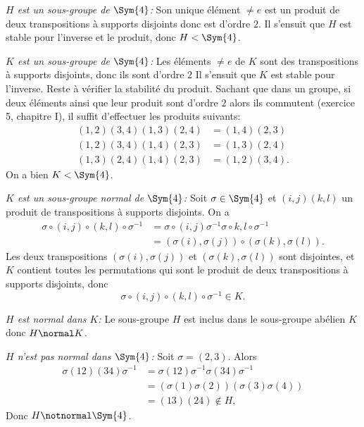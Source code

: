 \emph{$H$ est un sous-groupe de $\Sym{4}$:}
Son unique élément $\neq e$ est un produit de deux transpositions à supports
disjoints donc est d'ordre $2$. Il s'ensuit que $H$ est stable pour l'inverse et
le produit, donc $H<\Sym{4}$.

\emph{$K$ est un sous-groupe de $\Sym{4}$:}
Les éléments $\neq e$ de $K$ sont des transpositions à supports disjoints, donc
ils sont d'ordre $2$ Il s'ensuit que $K$ est stable pour l'inverse. Reste à
vérifier la stabilité du produit. Sachant que dans un groupe, si deux éléments
ainsi que leur produit sont d'ordre $2$ alors ils commutent (exercice 5,
chapitre I), il suffit
d'effectuer les produits suivants:
%
\begin{align*}
  (1,2)(3,4)(1,3)(2,4) &= (1,4)(2,3) \\
  (1,2)(3,4)(1,4)(2,3) &= (1,3)(2,4) \\
  (1,3)(2,4)(1,4)(2,3) &= (1,2)(3,4).
\end{align*}
%
On a bien $K<\Sym{4}$.

\emph{$K$ est un sous-groupe normal de $\Sym{4}$:}
Soit $\sigma\in\Sym{4}$ et $(i,j)(k,l)$ un produit de transpositions à supports
disjoints. On a
%
\begin{align*}
  \sigma\circ(i,j)\circ(k,l)\circ\sigma^{-1}
  &= \sigma\circ(i,j)\sigma^{-1}\sigma\circ{k,l}\circ\sigma^{-1} \\
  &= (\sigma(i),\sigma(j))\circ(\sigma(k),\sigma(l)).
\end{align*}
%
Les deux transpositions $(\sigma(i),\sigma(j))$ et $(\sigma(k),\sigma(l))$ sont
disjointes, et $K$ contient toutes les permutations qui sont le produit de deux
transpositions à supports disjoints, donc
\[
  \sigma\circ(i,j)\circ(k,l)\circ\sigma^{-1}\in K.
\]

\emph{$H$ est normal dans $K$:}
Le sous-groupe $H$ est inclus dans le sous-groupe abélien $K$ donc $H\normal K$.

\emph{$H$ n'est pas normal dans $\Sym{4}$:}
%
Soit $\sigma = (2,3)$. Alors
%
\begin{align*}
  \sigma(12)(34)\sigma^{-1}
  &= \sigma(12)\sigma^{-1}\sigma(34)\sigma^{-1} \\
  &= (\sigma(1)\sigma(2))(\sigma(3)\sigma(4))  \\
  &= (13)(24)\notin H,
\end{align*}
%
Donc $H\notnormal\Sym{4}$.

